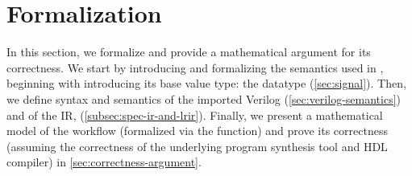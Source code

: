 \section{Formalization}
\label{sec:formalization}





%




In this section, we formalize \lr
  and provide a mathematical argument
  for its correctness.
We start by introducing and 
  formalizing the semantics used in \lr,
  beginning with introducing
  its base value type:
  the \signal datatype (\cref{sec:signal}).
Then, we define syntax and semantics
  of the imported Verilog (\cref{sec:verilog-semantics})
  and of the \lr IR, \lrir (\cref{subsec:spec-ir-and-lrir}).
Finally, we present
  a mathematical model
  of the \lr workflow
  (formalized via the \lrfn function)
  and prove its correctness
  (assuming the correctness of the underlying program synthesis tool and HDL compiler) in \cref{sec:correctness-argument}.

